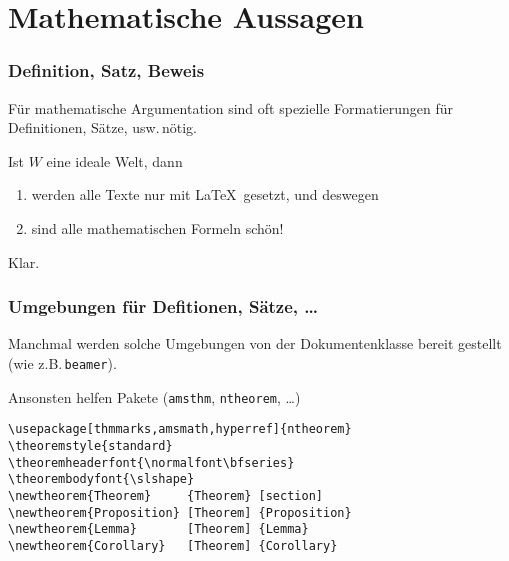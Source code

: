 \section{Mathematische Aussagen}

\begin{frame}
  \frametitle{Definition, Satz, Beweis}

  \onslide<+->

  Für mathematische Argumentation sind oft spezielle Formatierungen für Definitionen,
  Sätze, usw.\,nötig.

  \onslide<+->

  \begin{Lemma}
    Ist $W$ eine ideale Welt, dann
    \begin{enumerate}
    \item werden alle Texte nur mit \LaTeX\ gesetzt, und deswegen
    \item sind alle mathematischen Formeln schön!
    \end{enumerate}
  \end{Lemma}
  \onslide<+->
  \begin{Proof}
    \onslide<+->Klar.\onslide<+->
  \end{Proof}

\end{frame}

\begin{frame}[fragile]
  \frametitle{Umgebungen für Defitionen, Sätze, \dots}

  \onslide<+->

  Manchmal werden solche Umgebungen von der Dokumentenklasse bereit gestellt (wie
  z.B.\,\texttt{beamer}).

  \onslide<+->

  \medskip

  Ansonsten helfen Pakete (\texttt{amsthm}, \texttt{ntheorem}, \dots)

  \onslide<+->

\begin{lstlisting}
\usepackage[thmmarks,amsmath,hyperref]{ntheorem}
\theoremstyle{standard}
\theoremheaderfont{\normalfont\bfseries}
\theorembodyfont{\slshape}
\newtheorem{Theorem}     {Theorem} [section]
\newtheorem{Proposition} [Theorem] {Proposition}
\newtheorem{Lemma}       [Theorem] {Lemma}
\newtheorem{Corollary}   [Theorem] {Corollary}
\end{lstlisting}

\end{frame}

